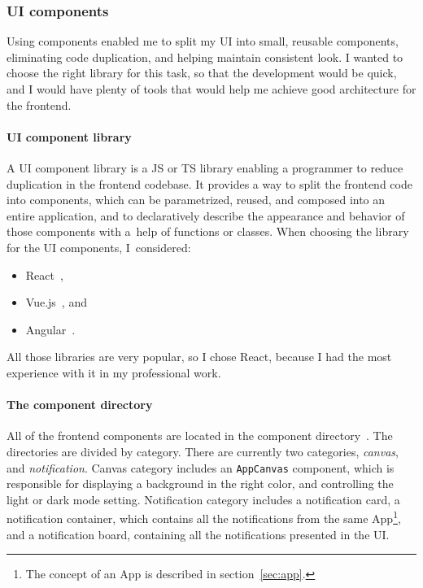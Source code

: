 \subsubsection{UI components}\label{sec:ui-components}

Using components enabled me to split my \ac{UI}
into small, reusable components,
eliminating code duplication,
and helping maintain consistent look.
I wanted to choose the right library
for this task,
so that the development would be quick,
and I would have plenty of tools
that would help me achieve
good architecture for the frontend.

\paragraph*{UI component library}\label{sec:ui-component-library}

A \ac{UI} component library is a \acf{JS} or \acf{TS} library
enabling a programmer to reduce duplication
in the frontend codebase.
It provides a way to split the frontend code into components,
which can be parametrized, reused, and composed into an entire application,
and to declaratively describe
the appearance and behavior of those components
with a~help of functions or classes.
When choosing the library for the \ac{UI} components, I~considered:

\begin{itemize}
  \item
        React~\cite{oshannessy_react_2022},
  \item
        Vue.js~\cite{you_vuejs_2022}, and
  \item
        Angular~\cite{kalpakas_angular_2022}.
\end{itemize}

All those libraries are very popular,
so I chose React,
because I had the most experience with it in my professional work.

\paragraph*{The component directory}\label{sec:the-component-directory}

All of the frontend components
are located in the component directory~\cite{sewera_notipie_2022-3}.
The directories are divided by category.
There are currently two categories,
\textit{canvas}, and
\textit{notification}.
Canvas category includes
an \texttt{AppCanvas} component,
which is responsible for displaying
a background in the right color,
and controlling the light or dark mode setting.
Notification category includes
a notification card,
a notification container,
which contains all the notifications
from the same App\footnote{
  The concept of an App is described
  in section~\ref{sec:app}.
}, and a notification board,
containing all the notifications
presented in the \ac{UI}.

